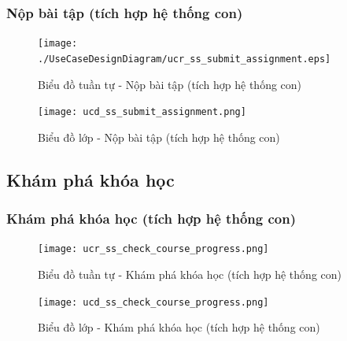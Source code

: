 \documentclass[./../main.tex]{subfiles}
\begin{document}
\subsubsection{Nộp bài tập (tích hợp hệ thống con)}
\begin{figure}[H]
    \centering
    \texttt{[image: ./UseCaseDesignDiagram/ucr\_ss\_submit\_assignment.eps]}
    \caption{Biểu đồ tuần tự - Nộp bài tập (tích hợp hệ thống con)}
\end{figure}
\begin{figure}[H]
    \centering
    \texttt{[image: ucd\_ss\_submit\_assignment.png]}
    \caption{Biểu đồ lớp - Nộp bài tập (tích hợp hệ thống con)}
\end{figure}

\subsection{Khám phá khóa học}
\subsubsection{Khám phá khóa học (tích hợp hệ thống con)}
\begin{figure}[H]
    \centering
    \texttt{[image: ucr\_ss\_check\_course\_progress.png]}
    \caption{Biểu đồ tuần tự - Khám phá khóa học (tích hợp hệ thống con)}
\end{figure}
\begin{figure}[H]
    \centering
    \texttt{[image: ucd\_ss\_check\_course\_progress.png]}
    \caption{Biểu đồ lớp - Khám phá khóa học (tích hợp hệ thống con)}
\end{figure}
\end{document}
